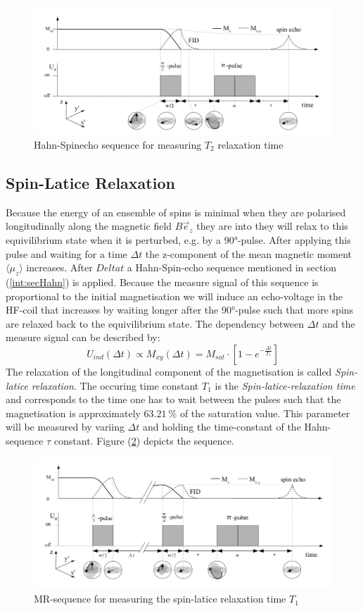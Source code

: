 		\begin{figure}[h]
			\centering
			\includegraphics[scale = 0.4]{pic/intro_t2}
			\caption{Hahn-Spinecho sequence for measuring $T_2$ relaxation time}
			\label{int:t2}
		\end{figure}
	\subsection{Spin-Latice Relaxation}
		Because the energy of an ensemble of spins is minimal when they are polarised longitudinally along the magnetic field $B\vec{e}_z$ they are into they will relax to this equivilibrium state when it is perturbed, e.g. by a 90°-pulse. After applying this pulse and waiting for a time $\Delta t$ the z-component of the mean magnetic moment $\langle \mu_z \rangle$ increases. After $Delta t$ a Hahn-Spin-echo sequence mentioned in section (\ref{int:secHahn}) is applied.  Because the measure signal of this sequence is proportional to the initial magnetisation we will induce an echo-voltage in the HF-coil that increases by waiting longer after the 90°-pulse such that more spins are relaxed back to the equivilibrium state. The dependency between $\Delta t$ and the measure signal can be described by:
		\begin{equation}
			U_{ind}(\Delta t) \propto M_{xy}(\Delta t) = M_{sat} \cdot [1-e^{-\frac{\Delta t}{T_1}}]
		\end{equation}
		The relaxation of the longitudinal component of the magnetisation is called \textit{Spin-latice relaxation}. The occuring time constant $T_1$ is the \textit{Spin-latice-relaxation time} and corresponds to the time one has to wait between the pulses such that the magnetisation is approximately $63.21\ \unit{\%}$ of the saturation value. This parameter will be measured by variing $\Delta t$ and holding the time-constant of the Hahn-sequence $\tau$ constant. Figure (\ref{int:t1}) depicts the sequence.
		
		\begin{figure}[h]
					\centering
					\includegraphics[scale = 0.4]{pic/intro_t1}
					\caption{MR-sequence for measuring the spin-latice relaxation time $T_1$}
					\label{int:t1}
		\end{figure}